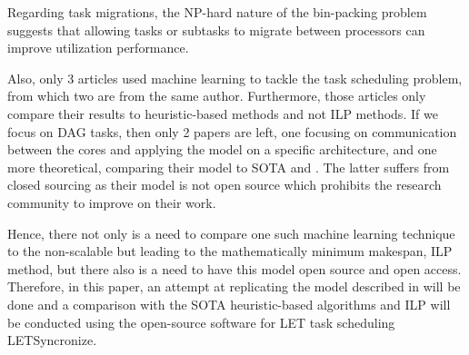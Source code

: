 Regarding task migrations, the NP-hard nature of the 
bin-packing problem suggests that allowing tasks or subtasks to migrate 
between processors can improve utilization performance.


Also, only 3 articles used machine learning to tackle the task scheduling problem,
from which two are from the same author.
Furthermore, those articles only compare their results to 
heuristic-based methods and not ILP methods.
If we focus on DAG tasks, then only 2 papers are left,
one focusing on communication between the cores and
applying the model on a specific architecture\cite{yano2021work},
and one more theoretical\cite{lee2021DAGDeeplearning}, comparing their model to SOTA 
\cite{zhao2020dag} and \cite{he2019intra}. The latter suffers 
from closed sourcing as their model is not open source
which prohibits the research community to improve on their work. 

Hence, there not only is a need to compare one such machine learning technique 
to the non-scalable but leading to the mathematically minimum makespan, ILP method,
but there also is a need to have this model open source and open access.
Therefore, in this paper, an attempt at replicating the model described
in \cite{lee2021DAGDeeplearning} will be done and 
a comparison with the SOTA heuristic-based algorithms
and ILP will be conducted using the open-source software 
for LET task scheduling LETSyncronize\cite{yip2023letsynchronise}.
